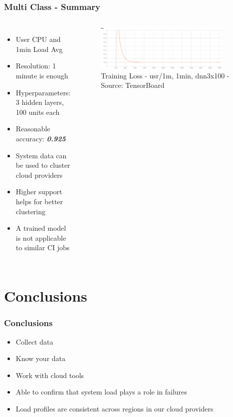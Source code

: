 \documentclass[aspectratio=169,11pt,hyperref={colorlinks=true}]{beamer}
\begin{document}
\begin{frame}
    \frametitle{Multi Class - Summary}
    \begin{columns}
        \begin{itemize}
            \item{User CPU and 1min Load Avg}
            \item{Resolution: 1 minute is enough}
            \item{Hyperparameters: 3 hidden layers, 100 units each}
            \item{Reasonable accuracy: \emph{\textbf{0.925}}}
            \item{System data can be used to cluster cloud providers}
            \item{Higher support helps for better clustering}
            \item{A trained model is not applicable to similar CI jobs}
        \end{itemize}
        \begin{figure}
          \begin{center}
            \includegraphics[width=0.9\textwidth,height=0.5\textheight]{graphs/cpu_1m-1min-dnn3x100-node_provider-loss_curve.png}
              \caption{Training Loss - usr/1m, 1min, dnn3x100 - Source: TensorBoard}
          \end{center}
        \end{figure}
      \end{columns}
\end{frame}

\section{Conclusions}
\begin{frame}
  \frametitle{Conclusions}
  \begin{itemize}
      \item{Collect data}
      \item{Know your data}
      \item{Work with cloud tools}
      \item{Able to confirm that system load plays a role in failures}
      \item{Load profiles are consistent across regions in our cloud providers}
    \end{itemize}
\end{frame}
\end{document}
